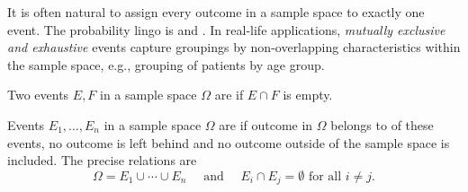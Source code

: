 \documentclass[../main.tex]{subfiles}
\begin{document}
%
%
%
%
%
%
%
%
%
%

It is often natural to assign every outcome in a sample space to exactly one event. The probability lingo is  and . In real-life applications, \emph{mutually exclusive and exhaustive} events capture groupings by non-overlapping characteristics within the sample space, e.g., grouping of patients by age group.

\begin{definition}
  Two events \(E, F\) in a sample space \(\Omega\) are  if \(E \cap F\) is empty. 

  Events \(E_{1}, \ldots, E_{n}\) in a sample space \(\Omega\) are  if  outcome in \(\Omega\) belongs to  of these events, no outcome is left behind and no outcome outside of the sample space is included. The precise relations are
  \[
    \Omega = E_{1} \cup \cdots \cup E_{n} \quad\text{ and }\quad E_{i} \cap E_{j} = \emptyset \text{ for all } i \ne j. 
  \]
\end{definition}
\end{document}
